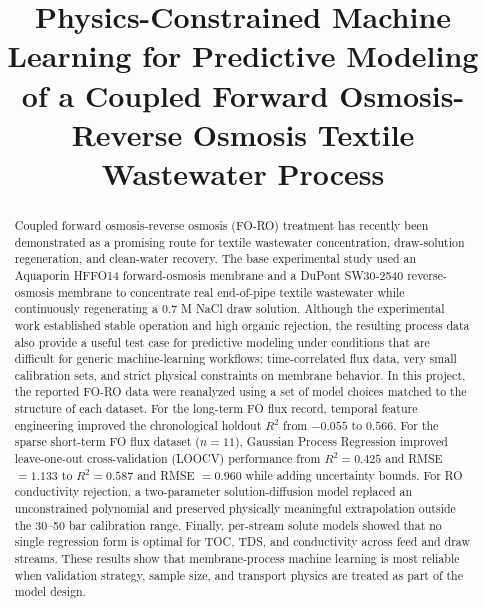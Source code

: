 \documentclass[journal, onecolumn, 12pt]{IEEEtran}
\begin{document}
\title{Physics-Constrained Machine Learning for Predictive Modeling of a Coupled Forward Osmosis-Reverse Osmosis Textile Wastewater Process}

\author{
}

\maketitle

\begin{abstract}
Coupled forward osmosis-reverse osmosis (FO-RO) treatment has recently been demonstrated as a promising route for textile wastewater concentration, draw-solution regeneration, and clean-water recovery. The base experimental study used an Aquaporin HFFO14 forward-osmosis membrane and a DuPont SW30-2540 reverse-osmosis membrane to concentrate real end-of-pipe textile wastewater while continuously regenerating a 0.7 M NaCl draw solution. Although the experimental work established stable operation and high organic rejection, the resulting process data also provide a useful test case for predictive modeling under conditions that are difficult for generic machine-learning workflows: time-correlated flux data, very small calibration sets, and strict physical constraints on membrane behavior. In this project, the reported FO-RO data were reanalyzed using a set of model choices matched to the structure of each dataset. For the long-term FO flux record, temporal feature engineering improved the chronological holdout $R^2$ from $-0.055$ to $0.566$. For the sparse short-term FO flux dataset ($n=11$), Gaussian Process Regression improved leave-one-out cross-validation (LOOCV) performance from $R^2=0.425$ and RMSE $=1.133$ to $R^2=0.587$ and RMSE $=0.960$ while adding uncertainty bounds. For RO conductivity rejection, a two-parameter solution-diffusion model replaced an unconstrained polynomial and preserved physically meaningful extrapolation outside the 30--50 bar calibration range. Finally, per-stream solute models showed that no single regression form is optimal for TOC, TDS, and conductivity across feed and draw streams. These results show that membrane-process machine learning is most reliable when validation strategy, sample size, and transport physics are treated as part of the model design.
\end{abstract}
\end{document}
